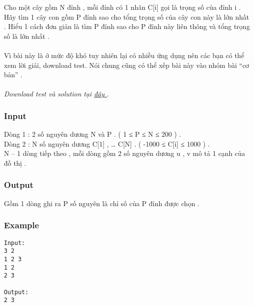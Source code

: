 



   Cho một cây gồm N đỉnh , mỗi đỉnh có 1 nhãn C[i] gọi là trọng số của đỉnh i . Hãy tìm 1 cây con gồm P đỉnh sao cho tổng trọng số của cây con này là lớn nhất . Hiểu 1 cách đơn giản là tìm P đỉnh sao cho P đỉnh này liên thông và tổng trọng số là lớn nhất .   
\\
\\       Vì bài này là ở mức độ khó tuy nhiên lại có nhiều ứng dụng nên các bạn có thể xem lời giải, download test. Nói chung cũng có thể xếp bài này vào nhóm bài “cơ bản” .      
\\
\\\textit{    Download test và solution tại    \href{http://vn.spoj.pl/content/ptree.rar}{     đây    }    .   }

\subsubsection{   Input  }

   Dòng 1 : 2 số nguyên dương N và P . ( 1 ≤ P ≤ N ≤ 200 ) .   
\\   Dòng 2 : N số nguyên dương C[1] , … C[N] . ( -1000 ≤ C[i] ≤ 1000 ) .   
\\   N – 1 dòng tiếp theo , mỗi dòng gồm 2 số nguyên dương u , v mô tả 1 cạnh của đồ thị .   
\\

\subsubsection{   Output  }

   Gồm 1 dòng ghi ra P số nguyên là chỉ số của P đỉnh được chọn .  

\subsubsection{   Example  }
\begin{verbatim}
Input:
3 2
1 2 3
1 2
2 3

Output:
2 3
\end{verbatim}